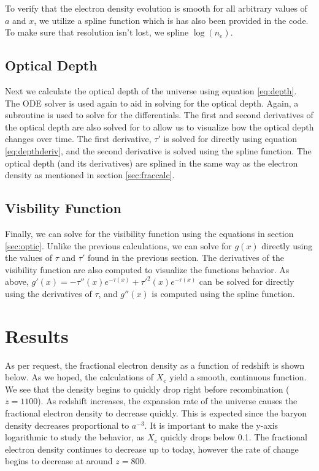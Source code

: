 \documentclass[twoside]{article}
\begin{document}
To verify that the electron density evolution is smooth for all arbitrary values of $a$ and $x$, we utilize a spline function which is has also been provided in the code. To make sure that resolution isn't lost, we spline $\log(n_e)$.

\subsection{Optical Depth}\label{sec:optcalc}

Next we calculate the optical depth of the universe using equation \ref{eq:depth}. The ODE solver is used again to aid in solving for the optical depth. Again, a subroutine is used to solve for the differentials. The first and second derivatives of the optical depth are also solved for to allow us to visualize how the optical depth changes over time. The first derivative, $\tau'$ is solved for directly using equation \ref{eq:depthderiv}, and the second derivative is solved using the spline function. The optical depth (and its derivatives) are splined in the same way as the electron density as mentioned in section \ref{sec:fraccalc}.


\subsection{Visbility Function}\label{sec:viscalc}

Finally, we can solve for the visibility function using the equations in section \ref{sec:optic}. Unlike the previous calculations, we can solve for $g(x)$ directly using the values of $\tau$ and $\tau'$ found in the previous section. The derivatives of the visibility function are also computed to visualize the functions behavior. As above, $g'(x) = -\tau''(x)e^{-\tau(x)}+\tau'^2(x)e^{-\tau(x)}$ can be solved for directly using the derivatives of $\tau$, and $g''(x)$ is computed using the spline function.

\clearpage

\section{Results}\label{sec:results}

As per request, the fractional electron density as a function of redshift is shown below. As we hoped, the calculations of $X_e$ yield a smooth, continuous function. We see that the density begins to quickly drop right before recombination ($z = 1100$). As redshift increases, the expansion rate of the universe causes the fractional electron density to decrease quickly. This is expected since the baryon density decreases proportional to $a^{-3}$. It is important to make the y-axis logarithmic to study the behavior, as $X_e$ quickly drops below 0.1. The fractional electron density continues to decrease up to today, however the rate of change begins to decrease at around $z=800$.
\end{document}
